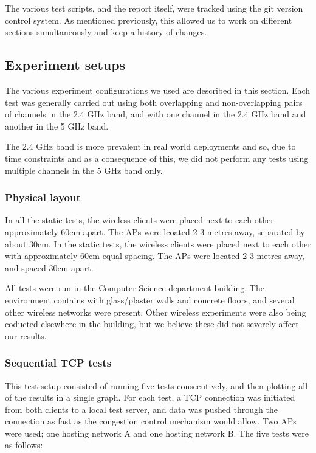 The various test scripts, and the report itself, were tracked using the git
version control system. As mentioned previously,
this allowed us to work on different sections simultaneously and keep a
history of changes.

\subsection{Experiment setups}
\label{sec:met:setups}
The various experiment configurations we used are described in this section. Each
test was generally carried out using both overlapping and non-overlapping pairs of
channels in the 2.4 GHz band, and with one channel in the 2.4 GHz band and another in the
5 GHz band.

The 2.4 GHz band is more prevalent in real world deployments and so, due to
time constraints and as a consequence of this, we did not perform any tests using
multiple channels in the 5 GHz band only.

\subsubsection{Physical layout}
In all the static tests, the wireless clients were placed next to each other
approximately 60cm apart. The APs were lcoated 2-3 metres away, separated by
about 30cm.
In the static tests, the wireless clients were placed next to each other with
approximately 60cm equal spacing. The APs were located 2-3 metres away, and
spaced 30cm apart.

All tests were run in the Computer Science department building. The environment
contains with glass/plaster walls and concrete floors, and several other wireless
networks were present. Other wireless experiments were
also being coducted elsewhere in the building, but we believe these did not severely
affect our results.

\subsubsection{Sequential TCP tests}
\label{sec:met:setups:seqtcp}
This test setup consisted of running five tests consecutively, and then
plotting all of the results in a single graph. For each test, a TCP connection was
initiated from both clients to a local test server, and data was pushed through
the connection as fast as the congestion control mechanism would allow. Two
APs were used; one hosting network A and one hosting network B. The five tests
were as follows:

